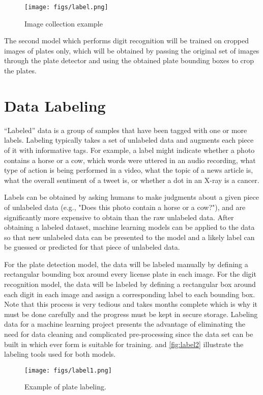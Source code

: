\begin{figure}[!htpb]
	\centering
	\texttt{[image: figs/label.png]}
	\caption{Image collection example}\label{fig:img1}
\end{figure}

The second model which performs digit recognition will be trained on cropped images of plates only, which will be obtained by passing the original set of images through the plate detector and using the obtained plate bounding boxes to crop the plates.

\section{Data Labeling}
``Labeled'' data is a group of samples that have been tagged with one or more labels. Labeling typically takes a set of unlabeled data and augments each piece of it with informative tags. For example, a label might indicate whether a photo contains a horse or a cow, which words were uttered in an audio recording, what type of action is being performed in a video, what the topic of a news article is, what the overall sentiment of a tweet is, or whether a dot in an X-ray is a cancer.

Labels can be obtained by asking humans to make judgments about a given piece of unlabeled data (e.g., "Does this photo contain a horse or a cow?"), and are significantly more expensive to obtain than the raw unlabeled data. After obtaining a labeled dataset, machine learning models can be applied to the data so that new unlabeled data can be presented to the model and a likely label can be guessed or predicted for that piece of unlabeled data.

For the plate detection model, the data will be labeled  manually by defining a rectangular bounding box around every license plate in each image. For the digit recognition model, the data will be labeled by defining a rectangular box around each digit in each image and assign a corresponding label to each bounding box. Note that this process is very tedious and takes months complete which is why it must be done carefully and the progress must be kept in secure storage. Labeling data for a machine learning project presents the advantage of eliminating the need for data cleaning and complicated pre-processing since the data set can be built in which ever form is suitable for training.  and \cref{fig:label2} illustrate the labeling tools used for both models.

\begin{figure}[!htpb]
	\centering
	\texttt{[image: figs/label1.png]}
	\caption{Example of plate labeling.}\label{fig:label1}
\end{figure}

